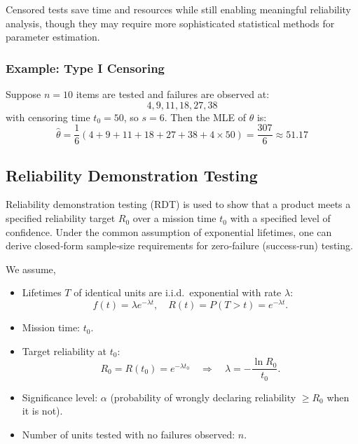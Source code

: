 \documentclass[twoside]{book}
\begin{document}
Censored tests save time and resources while still enabling meaningful reliability analysis, though they may require more sophisticated statistical methods for parameter estimation.

\subsubsection*{Example: Type I Censoring}

Suppose $n = 10$ items are tested and failures are observed at:
\[
4, 9, 11, 18, 27, 38
\]
with censoring time $t_0 = 50$, so $s = 6$. Then the MLE of $\theta$ is:
\[
\hat{\theta} = \frac{1}{6} \left(4 + 9 + 11 + 18 + 27 + 38 + 4 \times 50\right) = \frac{307}{6} \approx 51.17
\]

\subsection{Reliability Demonstration Testing}

Reliability demonstration testing (RDT) is used to show that a product meets a specified reliability target \(R_0\) over a mission time \(t_0\) with a specified level of confidence.  Under the common assumption of exponential lifetimes, one can derive closed‐form sample‐size requirements for zero‐failure (success‐run) testing.

We assume,
\begin{itemize}
  \item Lifetimes \(T\) of identical units are i.i.d.\ exponential with rate \(\lambda\):
    \[
      f(t)=\lambda e^{-\lambda t},\quad
      R(t)=P(T>t)=e^{-\lambda t}.
    \]
  \item Mission time: \(t_0\).
  \item Target reliability at \(t_0\):
    \[
      R_0 = R(t_0) = e^{-\lambda t_0}
      \quad\Longrightarrow\quad
      \lambda = -\frac{\ln R_0}{t_0}.
    \]
  \item Significance level: \(\alpha\) (probability of wrongly declaring reliability \(\ge R_0\) when it is not).
  \item Number of units tested with no failures observed: \(n\).
\end{itemize}
\end{document}
